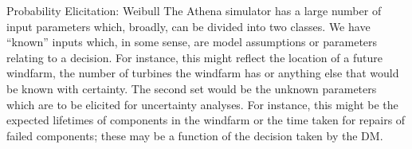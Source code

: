 
\begin{chapter}{Probability Elicitation: Weibull \label{Chap:elic-weib}}
The Athena simulator \cite{Zit13, Zit16} has a large number of input parameters which, broadly, can be divided into two classes. We have ``known'' inputs which, in some sense, are model assumptions or parameters relating to a decision. For instance, this might reflect the location of a future windfarm, the number of turbines the windfarm has or anything else that would be known with certainty. The second set would be the unknown parameters which are to be elicited for uncertainty analyses. For instance, this might be the expected lifetimes of components in the windfarm or the time taken for repairs of failed components; these may be a function of the decision taken by the DM. \\


\end{chapter}
